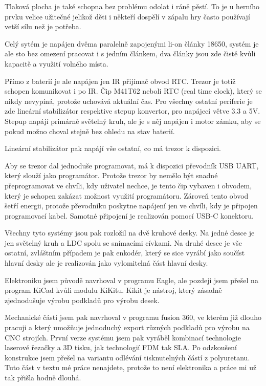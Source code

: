         Tlaková plocha je také schopna bez problému odolat i ráně pěstí. To je u herního prvku velice užitečné
        jelikož děti i někteří dospělí v zápalu hry často používají vetší sílu než je potřeba.

    Celý sytém je napájen dvěma paralelně zapojenými li-on články 18650, systém je ale sto bez omezení pracovat i s jedním článkem, 
    dva články jsou zde čistě kvůli kapacitě a využití volného místa.
    
    Přímo z baterií je ale napájen jen IR přijímač obvod RTC. Trezor je totiž schopen komunikovat i po IR. 
    Čip M41T62 neboli RTC (real time clock), který se nikdy nevypíná, protože uchovává aktuální čas. %
    Pro všechny ostatní periferie je zde lineární stabilizátor respektive stepup konvertor, pro napájecí větve 3.3 a 5V.
    Stepup napájí primárně světelný kruh, ale je s něj napájen i motor zámku, aby se pokud možno choval stejně bez ohledu na stav baterií.

    Lineární stabilizátor pak napájí vše ostatní, co má trezor k dispozici. %

    Aby se trezor dal jednoduše programovat, má k dispozici převodník USB UART, který slouží jako programátor.
    Protože trezor by nemělo být snadné přeprogramovat ve chvíli, kdy uživatel nechce, je tento čip vybaven 
    i obvodem, který je schopen zakázat možnost využití programátoru. Zároveň tento obvod šetří energii, protože 
    převodníku poskytne napájení jen ve chvíli, kdy je připojen programovací kabel. 
    Samotné připojení je realizován pomocí USB-C konektoru.

    Všechny tyto systémy jsou pak rozložil na dvě kruhové desky.
    Na jedné desce je jen světelný kruh a LDC spolu se snímacími cívkami.
    Na druhé desce je vše ostatní, zvláštním případem je pak enkodér, 
    který se sice vyrábí jako součíst hlavní desky ale je realizován jako vylomitelná část hlavní desky. %

    Elektroniku jsem původě navrhoval v programu Eagle, ale pozdeji jsem přešel na program KiCad kvůli modulu KiKitu. 
    Kikit je nástroj, který zásadně zjednodušuje výrobu podkladů pro výrobu desek. 
    

    Mechanické části jsem pak navrhoval v programu fusion 360, ve kterém již dlouho pracuji a který umožňuje jednoduchý 
    export různých podkladů pro výrobu na CNC strojích.
    První verze systému jsem pak vyráběl kombinací technologie laserové řezačky a 3D tisku, jak technologií FDM tak SLA.
    Po odzkoušení konstrukce jsem přešel na variantu odlévání tisknutelných částí z polyuretanu. 
    Tuto část v textu mé práce nenajdete, protože
    to není elektronika a práce mi už tak přišla hodně dlouhá.

